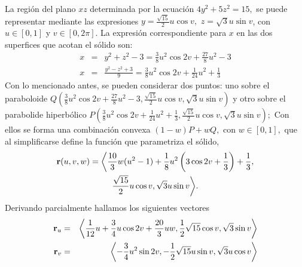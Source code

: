 \begin{enumerate}[leftmargin=0cm,itemindent=.75cm,labelwidth=\itemindent,labelsep=0cm,align=left,label={{\bf \arabic*)}}]
La región del plano $xz$ determinada por la ecuación $4y^{2}+5z^{2}=15,$ se puede representar
mediante las expresiones $y=\frac{\sqrt{15}}{2}u\cos v,$ $z=\sqrt{3}u\sin v$, con $u \in [0,1]$ y $v \in [0,2\pi].$
La expresión correspondiente para $x$ en las dos superfices que acotan el sólido son: 
\begin{eqnarray*}
x &=&y^{2}+z^{2}-3= \frac{3}{8}u^{2}\cos 2v+\frac{27}{8}u^{2}-3\\
x&=&\frac{y^{2}-z^{2}+3}{9}= \frac{3}{8}u^{2}\cos 2v+\frac{1}{24}u^{2}+\frac{1}{3}
\end{eqnarray*} 
Con lo mencionado antes, 
se pueden considerar dos puntos: uno sobre el paraboloide $Q\left( \frac{3}{8}u^{2}\cos 2v+\frac{27}{8}u^{2}-3,\frac{\sqrt{15}}{2}u\cos v,\sqrt{3}u\sin v\right)$ y otro sobre el parabolide hiperbólico
$P\left(\frac{3}{8}u^{2}\cos 2v+\frac{1}{24}u^{2}+\frac{1}{3},\frac{\sqrt{15}}{2}u\cos v,\sqrt{3}u\sin v\right);$
Con ellos se forma una combinación convexa $(1-w) P +wQ,$ con $w \in [0,1],$ que al simplificarse define la función que parametriza el sólido,  
\begin{multline*} 
{\bf r}(u,v,w)= \bigg\langle \frac{10}{3}w(u^{2}-1)+\frac{1}{8}u^{2}\left(3\cos 2v+\frac{1}{3}\right)+\frac{1}{3}, \\
\frac{\sqrt{15}}{2}u\cos v,\sqrt{3}u\sin v \bigg \rangle.\end{multline*}
Derivando parcialmente hallamos los siguientes vectores
\begin{eqnarray*}
{\bf r}_{u} &=&\left\langle \frac{1}{12}u+\frac{3}{4}u\cos 2v+\frac{20}{3}uw,\frac{1}{2}\sqrt{15}\cos v,\sqrt{3}\sin v\right\rangle\\
{\bf r}_{v}&=&\left\langle -\frac{3}{4}u^{2}\sin 2v,-\frac{1}{2}\sqrt{15}u\sin v,\sqrt{3}u\cos v\right\rangle  \\
\end{eqnarray*}


\end{enumerate}
